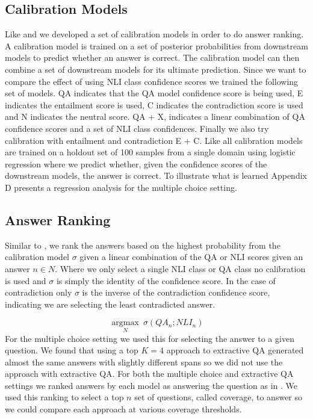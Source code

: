 \documentclass[11pt]{article}
\begin{document}
\subsection{Calibration Models}
Like \citet{kamath_selective_2020} and \citet{chen_can_2021} we developed a set of calibration models in order to do answer ranking. A calibration model is trained on a set of posterior probabilities from downstream models to predict whether an answer is correct. The calibration model can then combine a set of downstream models for its ultimate prediction. Since we want to compare the effect of using NLI class confidence scores we trained the following set of models. QA indicates that the QA model confidence score is being used, E indicates the entailment score is used, C indicates the contradiction score is used and N indicates the neutral score. QA + X, indicates a linear combination of QA confidence scores and a set of NLI class confidences. Finally we also try calibration with entailment and contradiction E + C. Like \citet{chen_can_2021} all calibration models are trained on a holdout set of 100 samples from a single domain using logistic regression where we predict whether, given the confidence scores of the downstream models, the answer is correct. To illustrate what is learned Appendix D presents a regression analysis for the multiple choice setting.
\subsection{Answer Ranking}
Similar to \citet{harabagiu_methods_2006}, we rank the answers based on the highest probability from the calibration model $\sigma$ given a linear combination of the QA or NLI scores given an answer $n \in N$. Where we only select a single NLI class or QA class no calibration is used and $\sigma$ is simply the identity of the confidence score. In the case of contradiction only $\sigma$ is the inverse of the contradiction confidence score, indicating we are selecting the least contradicted answer. 

$$
\underset{N}{\operatorname{argmax}}\:\sigma(QA_n;NLI_n)
$$
For the multiple choice setting we used this for selecting the answer to a given question. We found that using a top $K=4$ approach to extractive QA generated almost the same answers with slightly different spans so we did not use the approach with extractive QA. For both the multiple choice and extractive QA settings we ranked answers by each model as answering the question as in \citet{kamath_selective_2020}. We used this ranking to select a top $n$ set of questions, called coverage, to answer so we could compare each approach at various coverage thresholds.
\end{document}
